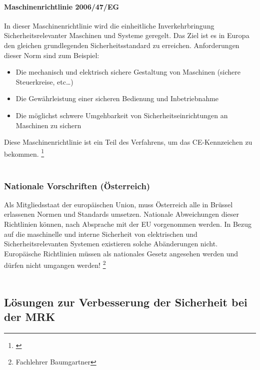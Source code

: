 \documentclass[titlepage,12pt,twoside]{article}
\begin{document}
\paragraph{Maschinenrichtlinie 2006/47/EG}
\hfill \break
\hfill \break
In dieser Maschinenrichtlinie wird die einheitliche Inverkehrbringung 
Sicherheitsrelevanter Maschinen und Systeme geregelt. Das Ziel ist es in Europa 
den gleichen grundlegenden Sicherheitsstandard zu erreichen. Anforderungen dieser 
Norm sind zum Beispiel: \\
\begin{itemize}
	\item Die mechanisch und elektrisch sichere Gestaltung von Maschinen (sichere Steuerkreise, etc…)
	\item Die Gewährleistung einer sicheren Bedienung und Inbetriebnahme
	\item Die möglichst schwere Umgehbarkeit von Sicherheitseinrichtungen an Maschinen zu sichern
\end{itemize}
\hfill \break
Diese Maschinenrichtlinie ist ein Teil des Verfahrens, um das CE-Kennzeichen zu 
bekommen. \footnote{\cite{TÜVsüd}}\\
\\
\subsubsection{Nationale Vorschriften (Österreich)}
Als Mitgliedsstaat der europäischen Union, muss Österreich alle in Brüssel 
erlassenen Normen und Standards umsetzen. Nationale Abweichungen dieser Richtlinien 
können, nach Absprache mit der EU vorgenommen werden. In Bezug auf die maschinelle 
und interne Sicherheit von elektrischen und Sicherheitsrelevanten Systemen existieren 
solche Abänderungen nicht. \\
Europäische Richtlinien müssen als nationales Gesetz angesehen werden und dürfen 
nicht umgangen werden! \footnote{Fachlehrer Baumgartner} \\
\\
\subsection{Lösungen zur Verbesserung der Sicherheit bei der MRK}
\end{document}
